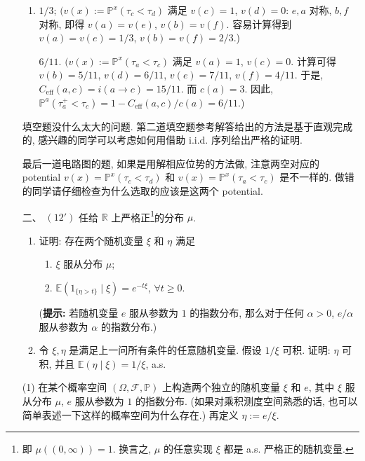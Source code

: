 \begin{enumerate}
\begin{proofc}[解答]
\begin{enumerate}[label=(\arabic*)]
            \item $\boxed{1/3}$; $(v(x):=\mathbb P^x(\tau_c<\tau_d)$ 满足 $v(c)=1$, $v(d)=0$: $e,a$
            对称, $b,f$ 对称, 即得 $v(a)=v(e)$, $v(b)=v(f)$. 容易计算得到
            $v(a)=v(e)=1/3$, $v(b)=v(f)=2/3$.)

            $\boxed{6/11}$. $(v(x):=\mathbb P^x(\tau_a<\tau_c)$ 满足 $v(a)=1$, $v(c)=0$.
            计算可得 $v(b)=5/11$, $v(d)=6/11$, $v(e)=7/11$, $v(f)=4/11$. 于是,
            $C_{\mathrm{eff}}(a,c)=i(a\to c)=15/11$. 而 $c(a)=3$. 因此,
            $\mathbb P^a(\tau_a^+<\tau_c)=1-C_{\mathrm{eff}}(a,c)/c(a)=6/11$.)\qedhere
        \end{enumerate}
        填空题没什么太大的问题. 第二道填空题参考解答给出的方法是基于直观完成的, 感兴趣的同学可以考虑如何用借助 i.i.d. 序列给出严格的证明. 
        
        最后一道电路图的题, 如果是用解相应位势的方法做, 注意两空对应的 potential $v(x)=\mathbb P^x(\tau_c<\tau_d)$ 和 $v(x)=\mathbb P^x(\tau_a<\tau_c)$ 是不一样的. 做错的同学请仔细检查为什么选取的应该是这两个 potential.
    \end{proofc}

    \item[二、]$(12')$ 任给 $\mathbb R$ 上严格正\footnote{即 $\mu((0,\infty))=1$. 
    换言之, $\mu$ 的任意实现 $\xi$ 都是 a.s. 严格正的随机变量.}的分布 $\mu$.
    \begin{enumerate}[label=(\arabic*)]
        \item 证明: 存在两个随机变量 $\xi$ 和 $\eta$ 满足
        \begin{enumerate}[label=\alph*)]
            \item $\xi$ 服从分布 $\mu$;
            \item $\mathbb E(1_{\{\eta>t\}}\mid \xi)=e^{-t\xi}$, $\forall t\geq 0$.
        \end{enumerate}

        (\textbf{提示:} 若随机变量 $e$ 服从参数为 $1$ 的指数分布, 那么对于任何 $\alpha>0$,
        $e/\alpha$ 服从参数为 $\alpha$ 的指数分布.)

        \item 令 $\xi,\eta$ 是满足上一问所有条件的任意随机变量. 假设 $1/\xi$ 可积.
        证明: $\eta$ 可积, 并且 $\mathbb E(\eta\mid \xi)=1/\xi$, a.s.
    \end{enumerate}

    \begin{proofc}[证明]
        (1) 在某个概率空间 $(\Omega,\mathscr F,\mathbb P)$ 上构造两个独立的随机变量
        $\xi$ 和 $e$, 其中 $\xi$ 服从分布 $\mu$, $e$ 服从参数为 $1$ 的指数分布. 
        (如果对乘积测度空间熟悉的话, 也可以简单表述一下这样的概率空间为什么存在.) 
        再定义 $\eta:=e/\xi$.


\end{proofc}
\end{enumerate}
